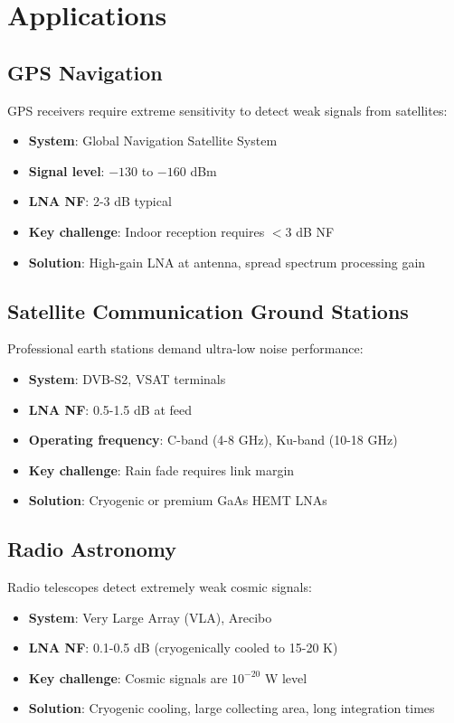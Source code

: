 \section{Applications}

\subsection{GPS Navigation}

GPS receivers require extreme sensitivity to detect weak signals from satellites:
\begin{itemize}
\item \textbf{System}: Global Navigation Satellite System
\item \textbf{Signal level}: $-130$ to $-160$ dBm
\item \textbf{LNA NF}: 2-3 dB typical
\item \textbf{Key challenge}: Indoor reception requires $<3$ dB NF
\item \textbf{Solution}: High-gain LNA at antenna, spread spectrum processing gain
\end{itemize}

\subsection{Satellite Communication Ground Stations}

Professional earth stations demand ultra-low noise performance:
\begin{itemize}
\item \textbf{System}: DVB-S2, VSAT terminals
\item \textbf{LNA NF}: 0.5-1.5 dB at feed
\item \textbf{Operating frequency}: C-band (4-8 GHz), Ku-band (10-18 GHz)
\item \textbf{Key challenge}: Rain fade requires link margin
\item \textbf{Solution}: Cryogenic or premium GaAs HEMT LNAs
\end{itemize}

\subsection{Radio Astronomy}

Radio telescopes detect extremely weak cosmic signals:
\begin{itemize}
\item \textbf{System}: Very Large Array (VLA), Arecibo
\item \textbf{LNA NF}: 0.1-0.5 dB (cryogenically cooled to 15-20 K)
\item \textbf{Key challenge}: Cosmic signals are $10^{-20}$ W level
\item \textbf{Solution}: Cryogenic cooling, large collecting area, long integration times
\end{itemize}

